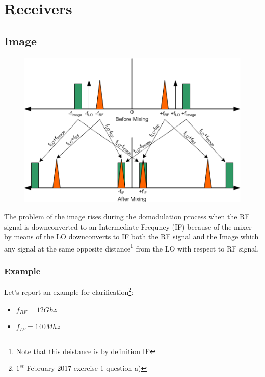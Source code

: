 


\chapter{Receivers} %
\label{cha:receivers}


\section{Image} %
\label{sec:image}

\begin{figure}[ht]
	\centering
	\includegraphics[scale=0.45]{Immagini/image}
	\label{fig:casip}
\end{figure}


The problem of the image rises during the domodulation process when the RF signal is downconverted to an Intermediate Frequncy (IF) because of the mixer by means of the LO downconverts to IF both the RF signal and the Image which any signal at the same opposite distance\footnote{Note that this deistance is by definition IF} from the LO with respect to RF signal.

\subsection*{Example} %
\label{sub:example}

Let's report an example for clarification\footnote{$1^{st}$ February 2017 exercise 1 question a)}:
\begin{itemize}
	\item $f_{RF}= 12 Ghz$ 
	\item $f_{IF}= 140 Mhz$ 
\end{itemize}

